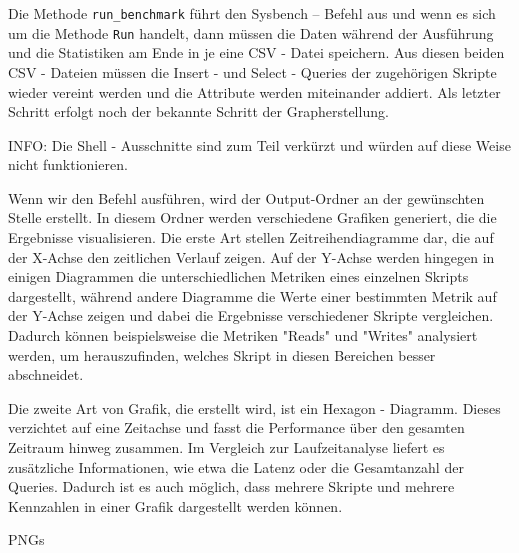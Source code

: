 

Die Methode \texttt{run\_benchmark} führt den Sysbench – Befehl aus und wenn es sich um die Methode \texttt{Run} handelt, dann müssen die Daten während der Ausführung und die Statistiken am Ende in je eine CSV - Datei speichern.
Aus diesen beiden CSV - Dateien müssen die Insert - und Select - Queries der zugehörigen Skripte wieder vereint werden und die Attribute werden miteinander addiert.
Als letzter Schritt erfolgt noch der bekannte Schritt der Grapherstellung.



INFO: Die Shell - Ausschnitte sind zum Teil verkürzt und würden auf diese Weise nicht funktionieren.

Wenn wir den Befehl ausführen, wird der Output-Ordner an der gewünschten Stelle erstellt.
In diesem Ordner werden verschiedene Grafiken generiert, die die Ergebnisse visualisieren.
Die erste Art stellen Zeitreihendiagramme dar, die auf der X-Achse den zeitlichen Verlauf zeigen.
Auf der Y-Achse werden hingegen in einigen Diagrammen die unterschiedlichen Metriken eines einzelnen Skripts dargestellt, während andere Diagramme die Werte einer bestimmten Metrik auf der Y-Achse zeigen und dabei die Ergebnisse verschiedener Skripte vergleichen.
Dadurch können beispielsweise die Metriken "Reads" und "Writes" analysiert werden, um herauszufinden, welches Skript in diesen Bereichen besser abschneidet.

Die zweite Art von Grafik, die erstellt wird, ist ein Hexagon - Diagramm.
Dieses verzichtet auf eine Zeitachse und fasst die Performance über den gesamten Zeitraum hinweg zusammen.
Im Vergleich zur Laufzeitanalyse liefert es zusätzliche Informationen, wie etwa die Latenz oder die Gesamtanzahl der Queries.
Dadurch ist es auch möglich, dass mehrere Skripte und mehrere Kennzahlen in einer Grafik dargestellt werden können.

PNGs

